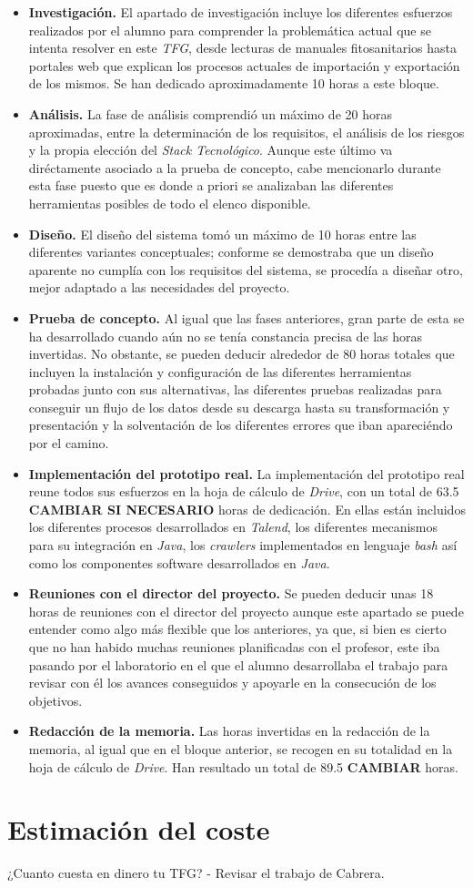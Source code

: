 \begin{itemize}
\item \textbf{Investigación. } El apartado de investigación incluye los diferentes esfuerzos realizados por el alumno para comprender la problemática actual que se intenta resolver en este \textit{TFG}, desde lecturas de manuales fitosanitarios hasta portales web que explican los procesos actuales de importación y exportación de los mismos. Se han dedicado aproximadamente 10 horas a este bloque.
\item \textbf{Análisis. } La fase de análisis comprendió un máximo de 20 horas aproximadas, entre la determinación de los requisitos, el análisis de los riesgos y la propia elección del \textit{Stack Tecnológico}. Aunque este último va diréctamente asociado a la prueba de concepto, cabe mencionarlo durante esta fase puesto que es donde a priori se analizaban las diferentes herramientas posibles de todo el elenco disponible. 
\item \textbf{Diseño. } El diseño del sistema tomó un máximo de 10 horas entre las diferentes variantes conceptuales; conforme se demostraba que un diseño aparente no cumplía con los requisitos del sistema, se procedía a diseñar otro, mejor adaptado a las necesidades del proyecto. 
\item \textbf{Prueba de concepto. } Al igual que las fases anteriores, gran parte de esta se ha desarrollado cuando aún no se tenía constancia precisa de las horas invertidas. No obstante, se pueden deducir alrededor de 80 horas totales que incluyen la instalación y configuración de las diferentes herramientas probadas junto con sus alternativas, las diferentes pruebas realizadas para conseguir un flujo de los datos desde su descarga hasta su transformación y presentación y la solventación de los diferentes errores que iban apareciéndo por el camino. 
\item \textbf{Implementación del prototipo real. } La implementación del prototipo real reune todos sus esfuerzos en la hoja de cálculo de \textit{Drive}, con un total de 63.5 \textbf{CAMBIAR SI NECESARIO} horas de dedicación. En ellas están incluidos los diferentes procesos desarrollados en \textit{Talend}, los diferentes mecanismos para su integración en \textit{Java}, los \textit{crawlers} implementados en lenguaje \textit{bash} así como los  componentes software desarrollados en \textit{Java}. 
\item \textbf{Reuniones con el director del proyecto. } Se pueden deducir unas 18 horas de reuniones con el director del proyecto aunque este apartado se puede entender como algo más flexible que los anteriores, ya que, si bien es cierto que no han habido muchas reuniones planificadas con el profesor, este iba pasando por el laboratorio en el que el alumno desarrollaba el trabajo para revisar con él los avances conseguidos y apoyarle en la consecución de los objetivos. 
\item \textbf{Redacción de la memoria. } Las horas invertidas en la redacción de la memoria, al igual que en el bloque anterior, se recogen en su totalidad en la hoja de cálculo de \textit{Drive}. Han resultado un total de 89.5 \textbf{CAMBIAR} horas.
\end{itemize}

\section{Estimación del coste} \label{gestion.estimacion}
¿Cuanto cuesta en dinero tu TFG? - Revisar el trabajo de Cabrera.